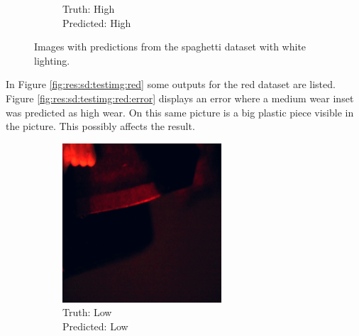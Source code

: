 \begin{figure}[hbtp]
\begin{subfigure}{.24\textwidth}
			\caption{Truth: High \\Predicted: High}
		\end{subfigure}
		\caption{Images with predictions from the spaghetti dataset with white lighting.}
		\label{fig:res:sd:testimg}
	\end{figure}

In Figure \ref{fig:res:sd:testimg:red} some outputs for the red dataset are listed. Figure \ref{fig:res:sd:testimg:red:error} displays an error where a medium wear inset was predicted as high wear. On this same picture is a big plastic piece visible in the picture. This possibly affects the result.
	\begin{figure}[hbtp]
		\begin{subfigure}{.24\textwidth}
			\centering
			\includegraphics[width=\linewidth]{fig/results/wandb/spaghetti_dataset/images/media_images_Examples_r_194_p1_t1.png}
			\caption{Truth: Low \\Predicted: Low}
		\end{subfigure}
		\hspace*{\fill}
		\begin{subfigure}{.24\textwidth}
			\centering

\end{subfigure}
\end{figure}
